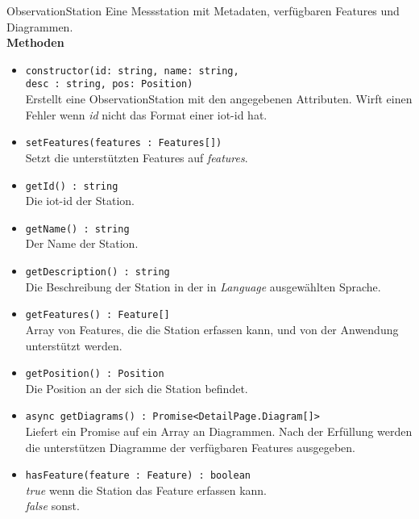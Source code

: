     \begin{Class}{ObservationStation}
        Eine Messstation mit Metadaten, verfügbaren Features und Diagrammen.
        \bigskip\\
        \textbf{Methoden}
        \begin{itemize}
            \item \texttt{constructor(id: string, name: string,
            \\ desc : string, pos: Position)}
            \\ Erstellt eine ObservationStation mit den angegebenen Attributen.
            Wirft einen Fehler wenn \emph{id} nicht das Format einer iot-id hat.
            \item \texttt{setFeatures(features : Features[])}
            \\ Setzt die unterstützten Features auf \emph{features}.
            \item \texttt{getId() : string}
            \\ Die iot-id der Station.
            \item \texttt{getName() : string}
            \\ Der Name der Station.
            \item \texttt{getDescription() : string}
            \\ Die Beschreibung der Station in der in \emph{Language} ausgewählten Sprache.
            \item \texttt{getFeatures() : Feature[]}
            \\ Array von Features, die die Station erfassen kann, und von der Anwendung unterstützt werden.
            \item \texttt{getPosition() : Position}
            \\ Die Position an der sich die Station befindet.
            \item \texttt{async getDiagrams() : Promise<DetailPage.Diagram[]>}
            \\ Liefert ein Promise auf ein Array an Diagrammen.
            Nach der Erfüllung werden die unterstützen Diagramme der verfügbaren Features ausgegeben.
            \item \texttt{hasFeature(feature : Feature) : boolean}
            \\ \emph{true} wenn die Station das Feature erfassen kann.
            \\ \emph{false} sonst.
        \end{itemize}
    \end{Class}

